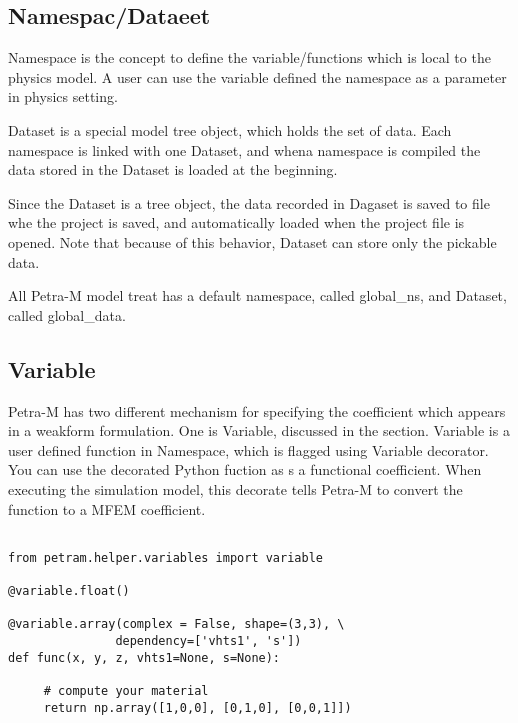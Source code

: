 \documentclass[11pt,a4paper,draft]{report}
\begin{document}
\subsection{Namespac/Dataeet}
Namespace is the concept to define the variable/functions which is local to the physics model. 
A user can use the variable defined the namespace as a parameter in physics setting. 

Dataset is a special model tree object, which holds the set of data. 
Each namespace is linked with one Dataset, and whena namespace is compiled the data stored in the Dataset is loaded at the beginning. 

Since the Dataset is a tree object, the data recorded in Dagaset  is saved to file whe the project is saved, and automatically loaded when the project file is opened.
Note that because of this behavior, Dataset can store only the pickable data. 

All Petra-M model treat has a default namespace, called global\_ns, and Dataset, called global\_data.

\subsection{Variable}
Petra-M has two different mechanism for specifying the coefficient which appears in a weakform formulation. One is Variable, discussed in the section.
Variable is a user defined function in Namespace, which is flagged using Variable decorator.
You can use the decorated Python fuction as s a functional coefficient.
When executing the simulation model, this decorate tells Petra-M to convert the function to a MFEM coefficient. 

\begin{minipage}[c]{0.95\textwidth}
\begin{lstlisting}[caption={A user defined generic preconditioner},captionpos=b, frame=single, label={function1}]

from petram.helper.variables import variable

@variable.float()

@variable.array(complex = False, shape=(3,3), \
               dependency=['vhts1', 's'])
def func(x, y, z, vhts1=None, s=None):

     # compute your material
     return np.array([1,0,0], [0,1,0], [0,0,1]])

\end{lstlisting}
 \end{minipage}
 
\end{document}
